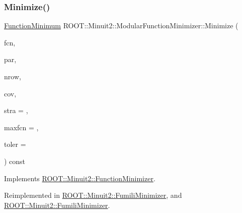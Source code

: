 \subsubsection{\texorpdfstring{Minimize()}{Minimize()}\hspace{0.1cm}{\footnotesize\ttfamily [6/22]}}
{\footnotesize\ttfamily \mbox{\hyperlink{classROOT_1_1Minuit2_1_1FunctionMinimum}{Function\+Minimum}} R\+O\+O\+T\+::\+Minuit2\+::\+Modular\+Function\+Minimizer\+::\+Minimize (\begin{DoxyParamCaption}\item[{const \mbox{\hyperlink{classROOT_1_1Minuit2_1_1FCNBase}{F\+C\+N\+Base}} \&}]{fcn,  }\item[{const std\+::vector$<$ double $>$ \&}]{par,  }\item[{unsigned int}]{nrow,  }\item[{const std\+::vector$<$ double $>$ \&}]{cov,  }\item[{unsigned int}]{stra = {},  }\item[{unsigned int}]{maxfcn = {},  }\item[{double}]{toler = {} }\end{DoxyParamCaption}) const\hspace{0.3cm}{\ttfamily [virtual]}}



Implements \mbox{\hyperlink{classROOT_1_1Minuit2_1_1FunctionMinimizer_a22d44dc8c018424a98ce8928ee7c5613}{R\+O\+O\+T\+::\+Minuit2\+::\+Function\+Minimizer}}.



Reimplemented in \mbox{\hyperlink{classROOT_1_1Minuit2_1_1FumiliMinimizer_ac2cff69bc8ac1702179b9e17288095a8}{R\+O\+O\+T\+::\+Minuit2\+::\+Fumili\+Minimizer}}, and \mbox{\hyperlink{classROOT_1_1Minuit2_1_1FumiliMinimizer_ac2cff69bc8ac1702179b9e17288095a8}{R\+O\+O\+T\+::\+Minuit2\+::\+Fumili\+Minimizer}}.

